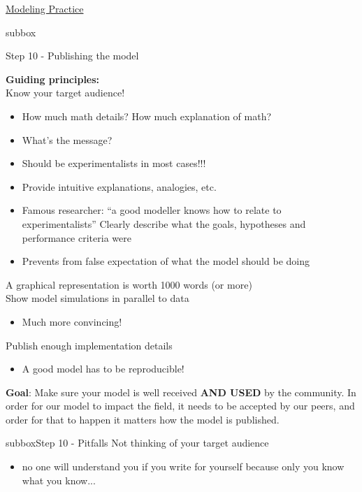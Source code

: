 \begin{textbox}{\href{https://compneuro.neuromatch.io/projects/modelingsteps/ModelingSteps_5through10.html}{Modeling Practice  } }

\begin{subbox}{subbox}{Step 10 - Publishing the model

}
\scriptsize

\textbf{Guiding principles:}\\
Know your target audience!
  \begin{itemize}
    \item How much math details? How much explanation of math?
  \item  What’s the message?
 \item  Should be experimentalists in most cases!!!
  \end{itemize}
    \begin{itemize}
    \item Provide intuitive explanations, analogies, etc.
    \item  Famous researcher: “a good modeller knows how to relate to experimentalists”
Clearly describe what the goals, hypotheses and performance criteria were
\end{itemize}
  \begin{itemize}
    \item Prevents from false expectation of what the model should be doing
    \end{itemize}
A graphical representation is worth 1000 words (or more)\\
Show model simulations in parallel to data
  \begin{itemize}
    \item Much more convincing!
    \end{itemize}
Publish enough implementation details
  \begin{itemize}
    \item A good model has to be reproducible! 
\end{itemize}
\textbf{Goal}: Make sure your model is well received \textbf{AND USED} by the community. In order for our model to impact the field, it needs to be accepted by our peers, and order for that to happen it matters how the model is published.


 \end{subbox}
\begin{subbox}{subbox}{Step 10 - Pitfalls }
\scriptsize
Not thinking of your target audience
\begin{itemize}
    \item no one will understand you if you write for yourself because only you know what you know...\end{itemize}


\end{subbox}
\end{textbox}
